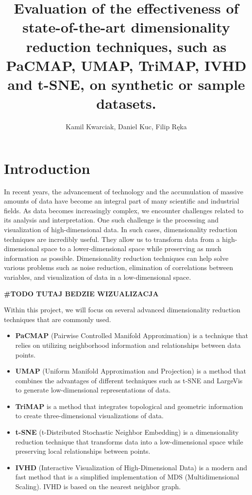 \documentclass{article}
\title{\textbf{Evaluation of the effectiveness of state-of-the-art dimensionality reduction techniques, such as PaCMAP, UMAP, TriMAP, IVHD and t-SNE, on synthetic or sample datasets.}}
\author{Kamil Kwarciak, Daniel Kuc, Filip Ręka}
\begin{document}
\date{}

\maketitle

\newpage
\section{Introduction}
    In recent years, the advancement of technology and the accumulation of massive amounts of data have become an integral part of many scientific and industrial fields. As data becomes increasingly complex, we encounter challenges related to its analysis and interpretation. One such challenge is the processing and visualization of high-dimensional data. In such cases, dimensionality reduction techniques are incredibly useful. They allow us to transform data from a high-dimensional space to a lower-dimensional space while preserving as much information as possible. Dimensionality reduction techniques can help solve various problems such as noise reduction, elimination of correlations between variables, and visualization of data in a low-dimensional space.
    
    \textbf{#TODO TUTAJ BEDZIE WIZUALIZACJA}
    
    Within this project, we will focus on several advanced dimensionality reduction techniques that are commonly used.
    \begin{itemize}
        \item \textbf{PaCMAP} (Pairwise Controlled Manifold Approximation) is a technique that relies on utilizing neighborhood information and relationships between data points. 
        \item \textbf{UMAP} (Uniform Manifold Approximation and Projection) is a method that combines the advantages of different techniques such as t-SNE and LargeVis to generate low-dimensional representations of data. 
        \item \textbf{TriMAP} is a method that integrates topological and geometric information to create three-dimensional visualizations of data. 
        \item \textbf{t-SNE} (t-Distributed Stochastic Neighbor Embedding) is a dimensionality reduction technique that transforms data into a low-dimensional space while preserving local relationships between points.
        \item \textbf{IVHD} (Interactive Visualization of High-Dimensional Data) is a modern and fast method that is a simplified implementation of MDS (Multidimensional Scaling). IVHD is based on the nearest neighbor graph.
    \end{itemize}
    
\end{document}
